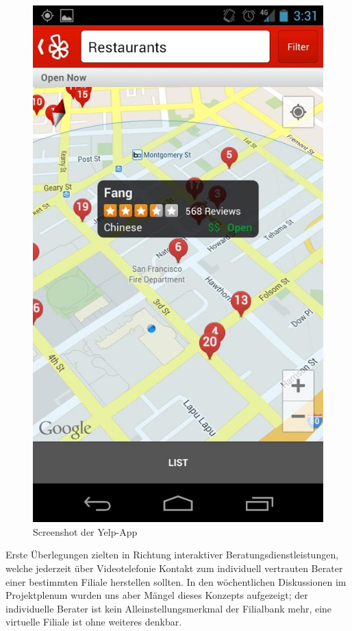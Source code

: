 \begin{figure}[h]
	\centering
	\includegraphics[scale=0.2]{Pictures/Yelp}
	\caption{Screenshot der Yelp-App \label{fig:Yelp}}
\end{figure}

	Erste Überlegungen zielten in Richtung interaktiver Beratungsdienstleistungen, welche jederzeit über Videotelefonie Kontakt zum individuell vertrauten Berater einer bestimmten Filiale herstellen sollten. In den wöchentlichen Diskussionen im Projektplenum wurden uns aber Mängel dieses Konzepts aufgezeigt; der individuelle Berater ist kein Alleinstellungsmerkmal der Filialbank mehr, eine virtuelle Filiale ist ohne weiteres denkbar.

